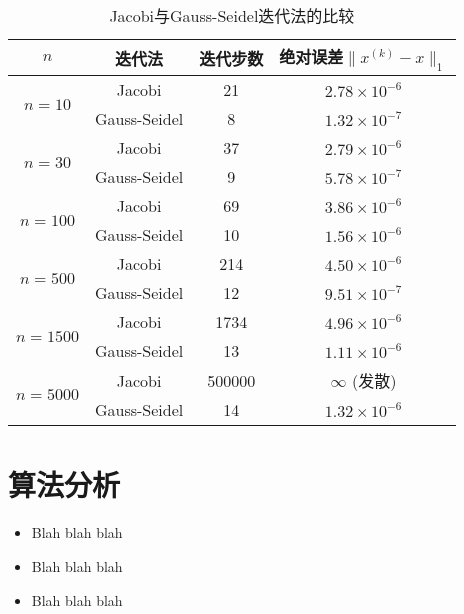 \documentclass[UTF8]{ctexart}
\begin{document}
    \begin{table}[ht]
        \centering
        \begin{tabular}{|c|c|c|c|}
            \hline
            $n$                          & 迭代法           & 迭代步数                & 绝对误差$\|x^{(k)}-x\|_1$\\
            \hline
            \multirow{2}{*}{$n=10$}      & Jacobi          & 21                   & $2.78 \times 10^{-6}$    \\
                                         & Gauss-Seidel    & 8                    & $1.32 \times 10^{-7}$    \\
            \hline
            \multirow{2}{*}{$n=30$}      & Jacobi          & 37                   & $2.79 \times 10^{-6}$    \\
                                         & Gauss-Seidel    & 9                    & $5.78 \times 10^{-7}$    \\
            \hline
            \multirow{2}{*}{$n=100$}     & Jacobi          & 69                   & $3.86 \times 10^{-6}$    \\
                                         & Gauss-Seidel    & 10                   & $1.56 \times 10^{-6}$    \\
            \hline
            \multirow{2}{*}{$n=500$}     & Jacobi          & 214                  & $4.50 \times 10^{-6}$    \\
                                         & Gauss-Seidel    & 12                   & $9.51 \times 10^{-7}$    \\
            \hline
            \multirow{2}{*}{$n=1500$}    & Jacobi          & 1734                 & $4.96 \times 10^{-6}$    \\
                                         & Gauss-Seidel    & 13                   & $1.11 \times 10^{-6}$    \\
            \hline
            \multirow{2}{*}{$n=5000$}    & Jacobi          & 500000               & $\infty$ (发散)          \\
                                         & Gauss-Seidel    & 14                   & $1.32 \times 10^{-6}$    \\
            \hline
        \end{tabular}
        \caption{Jacobi与Gauss-Seidel迭代法的比较}
        \label{tab:tab1}
    \end{table}


\section{算法分析}
    \begin{itemize}
        \item Blah blah blah
        \item Blah blah blah
        \item Blah blah blah
    \end{itemize}
\end{document}

